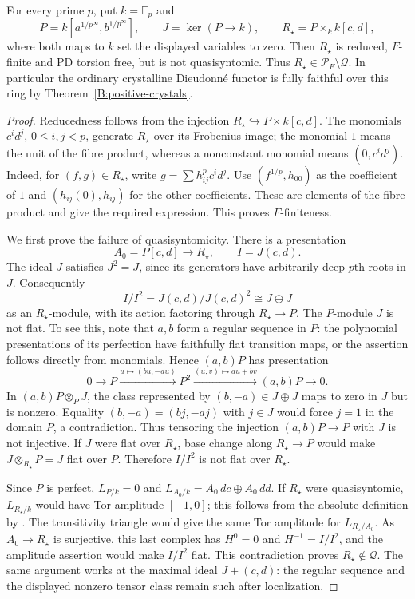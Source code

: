 \begin{proposition}
\label{B:PD-not-QSyn}
For every prime $p$, put $k=\mathbb F_p$ and
\[
 P=k[a^{1/p^\infty},b^{1/p^\infty}],\qquad
 J=\ker(P\longrightarrow k),\qquad
 R_\star=P\times_k k[c,d],
\]
where both maps to $k$ set the displayed variables to zero.
Then $R_\star$ is reduced, $F$-finite and PD torsion free, but is
not quasisyntomic. Thus
$R_\star\in\mathcal P_F\setminus\mathcal Q$.
In particular the ordinary crystalline Dieudonn\'e functor is
fully faithful over this ring by Theorem~\ref{B:positive-crystals}.
\end{proposition}

\begin{proof}
Reducedness follows from the injection
$R_\star\hookrightarrow P\times k[c,d]$. The monomials
$c^id^j$, $0\leq i,j<p$, generate $R_\star$ over its Frobenius
image; the monomial $1$ means the unit of the fibre product,
whereas a nonconstant monomial means $(0,c^id^j)$.
Indeed, for $(f,g)\in R_\star$, write
$g=\sum h_{ij}^pc^id^j$. Use $(f^{1/p},h_{00})$ as the
coefficient of $1$ and $(h_{ij}(0),h_{ij})$ for the other
coefficients. These are elements of the fibre product and give
the required expression. This proves $F$-finiteness.

We first prove the failure of quasisyntomicity. There is a
presentation
\[
 A_0=P[c,d]\longrightarrow R_\star,\qquad I=J(c,d).
\]
The ideal $J$ satisfies $J^2=J$, since its generators have
arbitrarily deep $p$th roots in $J$. Consequently
\[
 I/I^2=J(c,d)/J(c,d)^2\cong J\oplus J
\]
as an $R_\star$-module, with its action factoring through
$R_\star\to P$. The $P$-module $J$ is not flat. To see this, note
that $a,b$ form a regular sequence in $P$: the polynomial
presentations of its perfection have faithfully flat transition
maps, or the assertion follows directly from monomials. Hence
$(a,b)P$ has presentation
\[
 0\longrightarrow P
 \xrightarrow{u\mapsto(bu,-au)}P^2
 \xrightarrow{(u,v)\mapsto au+bv}(a,b)P\longrightarrow0.
\]
In $(a,b)P\otimes_PJ$, the class represented by $(b,-a)\in J\oplus J$
maps to zero in $J$ but is nonzero. Equality
$(b,-a)=(bj,-aj)$ with $j\in J$ would force $j=1$ in the domain
$P$, a contradiction. Thus tensoring the injection $(a,b)P\to P$
with $J$ is not injective. If $J$ were flat over $R_\star$, base
change along $R_\star\to P$ would make
$J\otimes_{R_\star}P=J$ flat over $P$. Therefore $I/I^2$ is not
flat over $R_\star$.

Since $P$ is perfect, $L_{P/k}=0$ and
$L_{A_0/k}=A_0\,dc\oplus A_0\,dd$. If $R_\star$ were
quasisyntomic, $L_{R_\star/k}$ would have Tor amplitude $[-1,0]$;
this follows from the absolute definition by
\cite[Lemma 4.34, with perfectoid base $k$]{B:BMS2}.
The transitivity triangle would give the same Tor amplitude for
$L_{R_\star/A_0}$. As $A_0\to R_\star$ is surjective, this last
complex has $H^0=0$ and $H^{-1}=I/I^2$, and the amplitude assertion
would make $I/I^2$ flat. This contradiction proves
$R_\star\notin\mathcal Q$. The same argument works at the maximal
ideal $J+(c,d)$: the regular sequence and the displayed nonzero
tensor class remain such after localization.


\end{proof}
